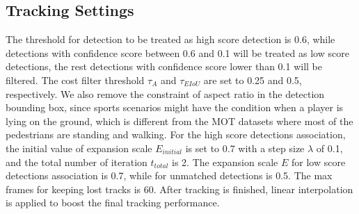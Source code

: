 \documentclass[10pt,twocolumn,letterpaper]{article}
\begin{document}
\subsection{Tracking Settings}
The threshold for detection to be treated as high score detection is 0.6, while detections with confidence score between 0.6 and 0.1 will be treated as low score detections, the rest detections with confidence score lower than 0.1 will be filtered. The cost filter threshold $\tau_A$ and $\tau_{EIoU}$ are set to 0.25 and 0.5, respectively. We also remove the constraint of aspect ratio in the detection bounding box, since sports scenarios might have the condition when a player is lying on the ground, which is different from the MOT datasets where most of the pedestrians are standing and walking. For the high score detections association, the initial value of expansion scale $E_{initial}$ is set to 0.7 with a step size $\lambda$ of 0.1, and the total number of iteration $t_{total}$ is 2. The expansion scale $E$ for low score detections association is 0.7, while for unmatched detections is 0.5. The max frames for keeping lost tracks is 60. After tracking is finished, linear interpolation is applied to boost the final tracking performance.
\end{document}
